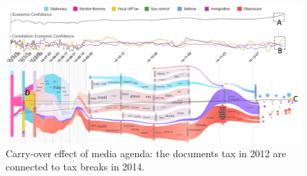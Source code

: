 \begin{figure}[t]
	\centering
	\includegraphics[width=0.85\linewidth]{fig/obamacase2legend}
	\vspace{-2mm}
	\caption{
		Carry-over effect of media agenda: the documents   tax  in 2012 are connected to tax breaks in 2014.
	}
	\label{fig:obamacase2}
	\vspace{-5mm}
\end{figure}




